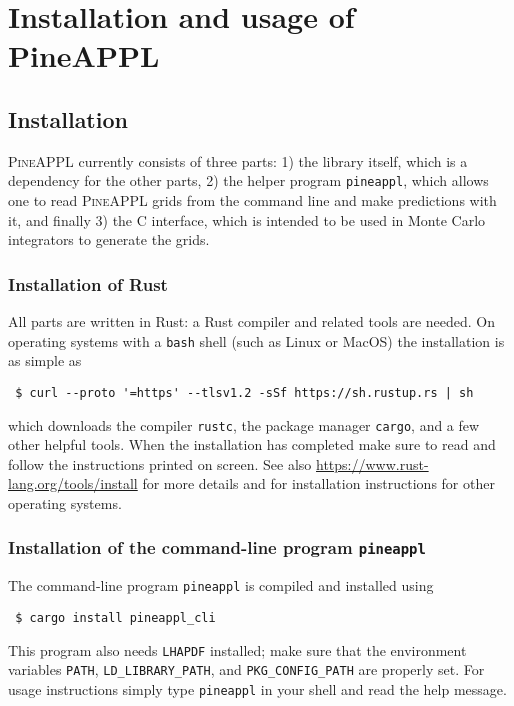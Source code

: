 \section{Installation and usage of PineAPPL}
\label{app:pineappl}

\subsection{Installation}
\label{app:installation}

\textsc{PineAPPL} currently consists of three parts: 1) the library itself, which is a dependency for the other parts, 2) the helper program \texttt{pineappl}, which allows one to read \textsc{PineAPPL} grids from the command line and make predictions with it, and finally 3) the C interface, which is intended to be used in Monte Carlo integrators to generate the grids.

\subsubsection*{Installation of Rust}


All parts are written in Rust: a Rust compiler and related tools are needed.
On operating systems with a \texttt{bash} shell (such as Linux or MacOS) the installation is as simple as
\begin{verbatim}
 $ curl --proto '=https' --tlsv1.2 -sSf https://sh.rustup.rs | sh
\end{verbatim}
which downloads the compiler \texttt{rustc}, the package manager \texttt{cargo}, and a few other helpful tools.
When the installation has completed make sure to read and follow the instructions printed on screen.
See also \url{https://www.rust-lang.org/tools/install} for more details and for installation instructions for other operating systems.

\subsubsection*{Installation of the command-line program \texorpdfstring{\texttt{pineappl}}{pineappl}}

The command-line program \texttt{pineappl} is compiled and installed using
\begin{verbatim}
 $ cargo install pineappl_cli
\end{verbatim}
This program also needs \texttt{LHAPDF} \cite{Buckley:2014ana} installed; make sure that the environment variables \texttt{PATH}, \texttt{LD\_LIBRARY\_PATH}, and \texttt{PKG\_CONFIG\_PATH} are properly set.
For usage instructions simply type \texttt{pineappl} in your shell and read the help message.

